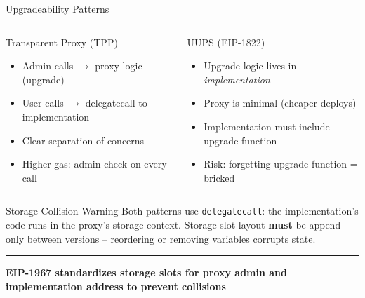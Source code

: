 \documentclass[8pt,aspectratio=169]{beamer}
\newcommand{\bottomnote}[1]{\vfill\vspace{-2mm}\textcolor{mllavender2}{\rule{\textwidth}{0.4pt}}\vspace{1mm}\footnotesize\textbf{#1}}
\begin{document}
\begin{frame}{Upgradeability Patterns}
\begin{center}
\end{center}
\vspace{2mm}
\begin{columns}
\begin{block}{Transparent Proxy (TPP)}
\begin{itemize}\small
  \item Admin calls $\to$ proxy logic (upgrade)
  \item User calls $\to$ delegatecall to implementation
  \item Clear separation of concerns
  \item Higher gas: admin check on every call
\end{itemize}
\end{block}
\begin{block}{UUPS (EIP-1822)}
\begin{itemize}\small
  \item Upgrade logic lives in \emph{implementation}
  \item Proxy is minimal (cheaper deploys)
  \item Implementation must include upgrade function
  \item Risk: forgetting upgrade function = bricked
\end{itemize}
\end{block}
\end{columns}
\vspace{2mm}
\begin{alertblock}{Storage Collision Warning}
\small Both patterns use \texttt{delegatecall}: the implementation's code runs in the proxy's storage context. Storage slot layout \textbf{must} be append-only between versions -- reordering or removing variables corrupts state.
\end{alertblock}
\bottomnote{EIP-1967 standardizes storage slots for proxy admin and implementation address to prevent collisions}
\end{frame}
\end{document}
